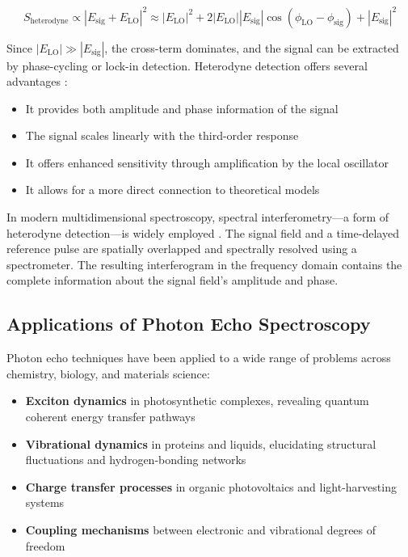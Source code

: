 \begin{equation}
    S_{\text{heterodyne}} \propto |E_{\text{sig}} + E_{\text{LO}}|^2 \approx |E_{\text{LO}}|^2 + 2|E_{\text{LO}}||E_{\text{sig}}|\cos(\phi_{\text{LO}} - \phi_{\text{sig}}) + |E_{\text{sig}}|^2
    \label{eq:heterodyne}
\end{equation}

\noindent Since $|E_{\text{LO}}| \gg |E_{\text{sig}}|$, the cross-term dominates, and the signal can be extracted by phase-cycling or lock-in detection. Heterodyne detection offers several advantages \cite{Lepetit1995}:

\begin{itemize}
    \item It provides both amplitude and phase information of the signal
    \item The signal scales linearly with the third-order response
    \item It offers enhanced sensitivity through amplification by the local oscillator
    \item It allows for a more direct connection to theoretical models
\end{itemize}

\noindent In modern multidimensional spectroscopy, spectral interferometry—a form of heterodyne detection—is widely employed \cite{Hybl1998}. The signal field and a time-delayed reference pulse are spatially overlapped and spectrally resolved using a spectrometer. The resulting interferogram in the frequency domain contains the complete information about the signal field's amplitude and phase.

\subsection{Applications of Photon Echo Spectroscopy}
\label{subsec:echo_applications}

\noindent Photon echo techniques have been applied to a wide range of problems across chemistry, biology, and materials science:

\begin{itemize}
    \item \textbf{Exciton dynamics} in photosynthetic complexes, revealing quantum coherent energy transfer pathways \cite{Engel2007, Schlau-Cohen2011}
    \item \textbf{Vibrational dynamics} in proteins and liquids, elucidating structural fluctuations and hydrogen-bonding networks \cite{Hamm2011}
    \item \textbf{Charge transfer processes} in organic photovoltaics and light-harvesting systems
    \item \textbf{Coupling mechanisms} between electronic and vibrational degrees of freedom \cite{Khalil2003}
\end{itemize}

